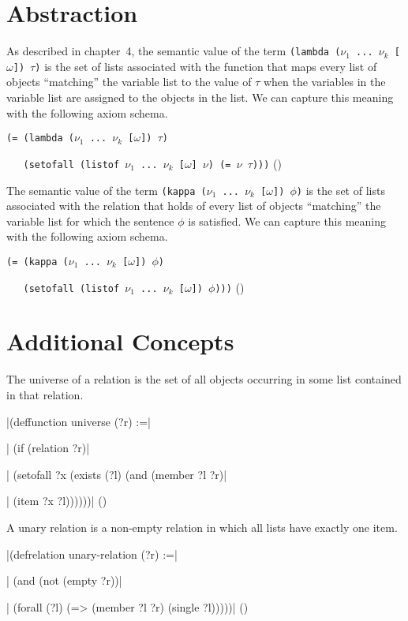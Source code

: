\section{Abstraction}

As described in chapter~4, the semantic value of the term {\tt (lambda
($\nu_1$ ... $\nu_k$ [$\omega$]) $\tau$)} is the set of lists associated with
the function that maps every list of objects ``matching'' the variable list
to the value of $\tau$ when the variables in the variable list are assigned to
the objects in the list.  We can capture this meaning with the following axiom
schema.

\medskip
{\tt (= (lambda ($\nu_1$ ... $\nu_k$ [$\omega$]) $\tau$)}\par
{\tt \ \ \ (setofall (listof $\nu_1$ ... $\nu_k$ [$\omega$] $\nu$) (= $\nu$ $\tau$)))}
\hfill(\equation)\par
\medskip

The semantic value of the term {\tt (kappa ($\nu_1$ ... $\nu_k$
[$\omega$]) $\phi$)} is the set of lists associated with the relation
that holds of every list of objects ``matching'' the variable list
for which the sentence $\phi$ is satisfied.  We can capture this meaning
with the following axiom schema. 

\medskip
{\tt (= (kappa ($\nu_1$ ... $\nu_k$ [$\omega$]) $\phi$)}\par
{\tt \ \ \ (setofall (listof $\nu_1$ ... $\nu_k$ [$\omega$]) $\phi$)))}
\hfill(\equation)\par \medskip

\section{Additional Concepts}

The universe of a relation is the set of all objects occurring in some
list contained in that relation.

\medskip
\verbatim|(deffunction universe (?r) :=|\par
\verbatim|  (if (relation ?r)|\par
\verbatim|      (setofall ?x (exists (?l) (and (member ?l ?r)|\par
\verbatim|                                     (item ?x ?l))))))| 
\hfill(\equation)\par
\medskip

A unary relation is a non-empty relation in which all lists have exactly one
item.

\medskip
\verbatim|(defrelation unary-relation (?r) :=|\par
\verbatim|  (and (not (empty ?r))|\par
\verbatim|       (forall (?l) (=> (member ?l ?r) (single ?l)))))|
\hfill(\equation)\par
\medskip

